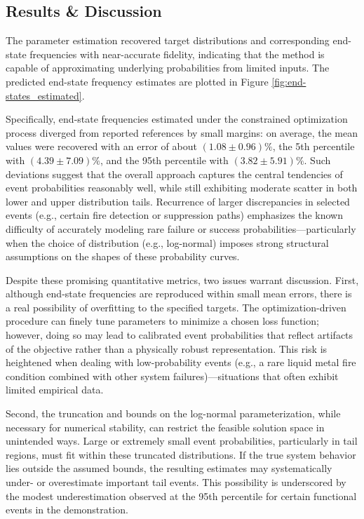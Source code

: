 \subsection{Results \& Discussion}
\label{sec:results_and_discussion_estimation}
The parameter estimation recovered target distributions and corresponding end-state frequencies with near-accurate fidelity, indicating that the method is capable of approximating underlying probabilities from limited inputs. The predicted end-state frequency estimates are plotted in Figure \ref{fig:end-states_estimated}.

Specifically, end-state frequencies estimated under the constrained optimization process diverged from reported references by small margins: on average, the mean values were recovered with an error of about \((1.08\pm 0.96)\%\), the 5th percentile with \((4.39\pm 7.09)\%\), and the 95th percentile with \((3.82\pm 5.91)\%\).  Such deviations suggest that the overall approach captures the central tendencies of event probabilities reasonably well, while still exhibiting moderate scatter in both lower and upper distribution tails.  Recurrence of larger discrepancies in selected events (e.g., certain fire detection or suppression paths) emphasizes the known difficulty of accurately modeling rare failure or success probabilities—particularly when the choice of distribution (e.g., log-normal) imposes strong structural assumptions on the shapes of these probability curves.

Despite these promising quantitative metrics, two issues warrant discussion. First, although end-state frequencies are reproduced within small mean errors, there is a real possibility of overfitting to the specified targets.  The optimization-driven procedure can finely tune parameters to minimize a chosen loss function; however, doing so may lead to calibrated event probabilities that reflect artifacts of the objective rather than a physically robust representation.  This risk is heightened when dealing with low-probability events (e.g., a rare liquid metal fire condition combined with other system failures)—situations that often exhibit limited empirical data.  

Second, the truncation and bounds on the log-normal parameterization, while necessary for numerical stability, can restrict the feasible solution space in unintended ways.  Large or extremely small event probabilities, particularly in tail regions, must fit within these truncated distributions.  If the true system behavior lies outside the assumed bounds, the resulting estimates may systematically under- or overestimate important tail events.  This possibility is underscored by the modest underestimation observed at the 95th percentile for certain functional events in the demonstration.